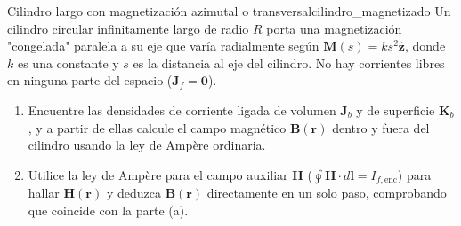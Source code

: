 \documentclass[11pt,a4paper]{book}
\newcommand{\zhat}{\hat{\bm{z}}}
\newcommand{\Bvec}{\bm{B}}
\newcommand{\Hvec}{\bm{H}}
\newcommand{\Mvec}{\bm{M}}
\newcommand{\Jvec}{\bm{J}}
\begin{document}
\begin{ejercicio}{Cilindro largo con magnetización azimutal o transversal}{cilindro_magnetizado}
Un cilindro circular infinitamente largo de radio $R$ porta una magnetización "congelada" paralela a su eje que varía radialmente según $\Mvec(s) = k s^2 \zhat$, donde $k$ es una constante y $s$ es la distancia al eje del cilindro. No hay corrientes libres en ninguna parte del espacio ($\Jvec_f = \bm{0}$).
\begin{enumerate}[label=\alph*)]
    \item Encuentre las densidades de corriente ligada de volumen $\Jvec_b$ y de superficie $\bm{K}_b$, y a partir de ellas calcule el campo magnético $\Bvec(\bm{r})$ dentro y fuera del cilindro usando la ley de Ampère ordinaria.
    \item Utilice la ley de Ampère para el campo auxiliar $\Hvec$ ($\oint \Hvec \cdot d\bm{l} = I_{f,\text{enc}}$) para hallar $\Hvec(\bm{r})$ y deduzca $\Bvec(\bm{r})$ directamente en un solo paso, comprobando que coincide con la parte (a).
\end{enumerate}
\end{ejercicio}
\end{document}
